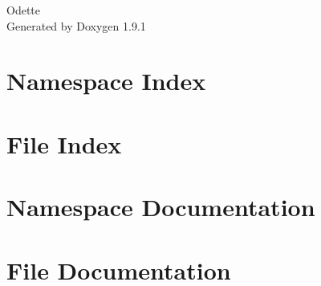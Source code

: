\let\mypdfximage\pdfximage\def\pdfximage{\immediate\mypdfximage}\documentclass[twoside]{book}
\newcommand{\+}{\discretionary{\mbox{\scriptsize$\hookleftarrow$}}{}{}}
\newcommand{\clearemptydoublepage}{%
  \newpage{\pagestyle{empty}\cleardoublepage}%
}
\begin{document}
\raggedbottom

\hypersetup{pageanchor=false,
             bookmarksnumbered=true,
             pdfencoding=unicode
            }
\begin{titlepage}
\vspace*{7cm}
\begin{center}%
{\Large Odette }\\
\vspace*{1cm}
{\large Generated by Doxygen 1.9.1}\\
\end{center}
\end{titlepage}
\clearemptydoublepage
{}
\tableofcontents
\clearemptydoublepage
{}
\hypersetup{pageanchor=true}

\chapter{Namespace Index}

\chapter{File Index}

\chapter{Namespace Documentation}




\chapter{File Documentation}



















\backmatter
\newpage
{}
\clearemptydoublepage
{}
\printindex
\end{document}
